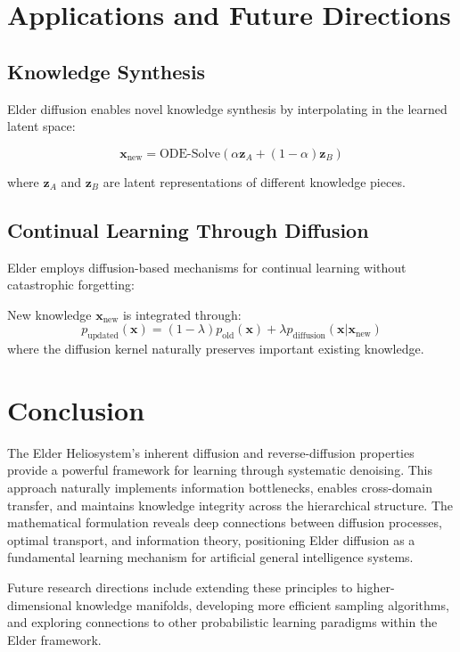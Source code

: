 \section{Applications and Future Directions}

\subsection{Knowledge Synthesis}

Elder diffusion enables novel knowledge synthesis by interpolating in the learned latent space:

\begin{equation}
\mathbf{x}_{\text{new}} = \text{ODE-Solve}(\alpha \mathbf{z}_A + (1-\alpha) \mathbf{z}_B)
\end{equation}

where $\mathbf{z}_A$ and $\mathbf{z}_B$ are latent representations of different knowledge pieces.

\subsection{Continual Learning Through Diffusion}

Elder employs diffusion-based mechanisms for continual learning without catastrophic forgetting:

\begin{definition}
New knowledge $\mathbf{x}_{\text{new}}$ is integrated through:
\begin{equation}
p_{\text{updated}}(\mathbf{x}) = (1-\lambda) p_{\text{old}}(\mathbf{x}) + \lambda p_{\text{diffusion}}(\mathbf{x} | \mathbf{x}_{\text{new}})
\end{equation}
where the diffusion kernel naturally preserves important existing knowledge.
\end{definition}

\section{Conclusion}

The Elder Heliosystem's inherent diffusion and reverse-diffusion properties provide a powerful framework for learning through systematic denoising. This approach naturally implements information bottlenecks, enables cross-domain transfer, and maintains knowledge integrity across the hierarchical structure. The mathematical formulation reveals deep connections between diffusion processes, optimal transport, and information theory, positioning Elder diffusion as a fundamental learning mechanism for artificial general intelligence systems.

Future research directions include extending these principles to higher-dimensional knowledge manifolds, developing more efficient sampling algorithms, and exploring connections to other probabilistic learning paradigms within the Elder framework.